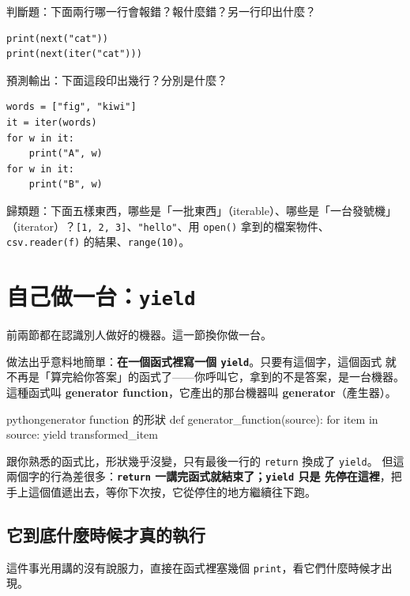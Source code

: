 \begin{drills}[label=drills:iterable-vs-iterator]
\item 判斷題：下面兩行哪一行會報錯？報什麼錯？另一行印出什麼？
\begin{verbatim}
print(next("cat"))
print(next(iter("cat")))
\end{verbatim}
\item 預測輸出：下面這段印出幾行？分別是什麼？
\begin{verbatim}
words = ["fig", "kiwi"]
it = iter(words)
for w in it:
    print("A", w)
for w in it:
    print("B", w)
\end{verbatim}
\item 歸類題：下面五樣東西，哪些是「一批東西」（iterable）、哪些是「一台發號機」
（iterator）？\texttt{[1, 2, 3]}、\texttt{"hello"}、用 \texttt{open()} 拿到的檔案物件、
\texttt{csv.reader(f)} 的結果、\texttt{range(10)}。
\end{drills}

\section{自己做一台：\texttt{yield}}
\label{sec:yield-basics}

前兩節都在認識別人做好的機器。這一節換你做一台。

做法出乎意料地簡單：\textbf{在一個函式裡寫一個 \texttt{yield}}。只要有這個字，這個函式
就不再是「算完給你答案」的函式了——你呼叫它，拿到的不是答案，是一台機器。這種函式叫
\textbf{generator function}，它產出的那台機器叫 \textbf{generator}（產生器）。

\begin{code}{python}{generator function 的形狀}
def generator_function(source):
    for item in source:
        yield transformed_item
\end{code}

跟你熟悉的函式比，形狀幾乎沒變，只有最後一行的 \texttt{return} 換成了 \texttt{yield}。
但這兩個字的行為差很多：\textbf{\texttt{return} 一講完函式就結束了；\texttt{yield} 只是
先停在這裡}，把手上這個值遞出去，等你下次按，它從停住的地方繼續往下跑。

\subsection*{它到底什麼時候才真的執行}

這件事光用講的沒有說服力，直接在函式裡塞幾個 \texttt{print}，看它們什麼時候才出現。

